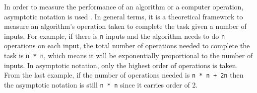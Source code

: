 In order to measure the performance of an algorithm or a computer operation, asymptotic notation is used \citep{AlgorithmAndDataStructure}. In general terms, it is a theoretical framework to measure an algorithm's operation taken to complete the task given a number of inputs. For example, if there is \texttt{n} inputs and the algorithm needs to do \texttt{n} operations on each input, the total number of operations needed to complete the task is \texttt{n * n}, which means it will be exponentially proportional to the number of inputs. In asymptotic notation, only the highest order of operations is taken. From the last example, if the number of operations needed is \texttt{n * n + 2n} then the asymptotic notation is still \texttt{n * n} since it carries order of 2.